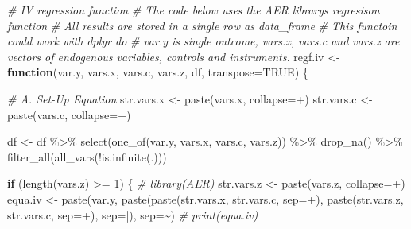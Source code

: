 \documentclass[
]{book}
\newenvironment{Shaded}{\begin{snugshade}}{\end{snugshade}}
\newcommand{\AttributeTok}[1]{\textcolor[rgb]{0.77,0.63,0.00}{#1}}
\newcommand{\CommentTok}[1]{\textcolor[rgb]{0.56,0.35,0.01}{\textit{#1}}}
\newcommand{\ConstantTok}[1]{\textcolor[rgb]{0.00,0.00,0.00}{#1}}
\newcommand{\ControlFlowTok}[1]{\textcolor[rgb]{0.13,0.29,0.53}{\textbf{#1}}}
\newcommand{\DecValTok}[1]{\textcolor[rgb]{0.00,0.00,0.81}{#1}}
\newcommand{\FunctionTok}[1]{\textcolor[rgb]{0.00,0.00,0.00}{#1}}
\newcommand{\NormalTok}[1]{#1}
\newcommand{\OtherTok}[1]{\textcolor[rgb]{0.56,0.35,0.01}{#1}}
\newcommand{\SpecialCharTok}[1]{\textcolor[rgb]{0.00,0.00,0.00}{#1}}
\newcommand{\StringTok}[1]{\textcolor[rgb]{0.31,0.60,0.02}{#1}}
\begin{document}
\begin{Shaded}
\begin{Highlighting}[]
\CommentTok{\# IV regression function}
\CommentTok{\# The code below uses the AER library\textquotesingle{}s regresison function}
\CommentTok{\# All results are stored in a single row as data\_frame}
\CommentTok{\# This functoin could work with dplyr do}
\CommentTok{\# var.y is single outcome, vars.x, vars.c and vars.z are vectors of endogenous variables, controls and instruments.}
\NormalTok{regf.iv }\OtherTok{\textless{}{-}} \ControlFlowTok{function}\NormalTok{(var.y, vars.x, }
\NormalTok{                    vars.c, vars.z, df, }\AttributeTok{transpose=}\ConstantTok{TRUE}\NormalTok{) \{}
  
  \CommentTok{\# A. Set{-}Up Equation}
\NormalTok{  str.vars.x }\OtherTok{\textless{}{-}} \FunctionTok{paste}\NormalTok{(vars.x, }\AttributeTok{collapse=}\StringTok{\textquotesingle{}+\textquotesingle{}}\NormalTok{)}
\NormalTok{  str.vars.c }\OtherTok{\textless{}{-}} \FunctionTok{paste}\NormalTok{(vars.c, }\AttributeTok{collapse=}\StringTok{\textquotesingle{}+\textquotesingle{}}\NormalTok{)}
  
\NormalTok{  df }\OtherTok{\textless{}{-}}\NormalTok{ df }\SpecialCharTok{\%\textgreater{}\%} 
    \FunctionTok{select}\NormalTok{(}\FunctionTok{one\_of}\NormalTok{(var.y, vars.x, vars.c, vars.z)) }\SpecialCharTok{\%\textgreater{}\%} 
    \FunctionTok{drop\_na}\NormalTok{() }\SpecialCharTok{\%\textgreater{}\%} \FunctionTok{filter\_all}\NormalTok{(}\FunctionTok{all\_vars}\NormalTok{(}\SpecialCharTok{!}\FunctionTok{is.infinite}\NormalTok{(.)))}
  
  \ControlFlowTok{if}\NormalTok{ (}\FunctionTok{length}\NormalTok{(vars.z) }\SpecialCharTok{\textgreater{}=} \DecValTok{1}\NormalTok{) \{}
    \CommentTok{\#     library(AER)}
\NormalTok{    str.vars.z }\OtherTok{\textless{}{-}} \FunctionTok{paste}\NormalTok{(vars.z, }\AttributeTok{collapse=}\StringTok{\textquotesingle{}+\textquotesingle{}}\NormalTok{)}
\NormalTok{    equa.iv }\OtherTok{\textless{}{-}} \FunctionTok{paste}\NormalTok{(var.y,}
                     \FunctionTok{paste}\NormalTok{(}\FunctionTok{paste}\NormalTok{(str.vars.x, str.vars.c, }\AttributeTok{sep=}\StringTok{\textquotesingle{}+\textquotesingle{}}\NormalTok{),}
                           \FunctionTok{paste}\NormalTok{(str.vars.z, str.vars.c, }\AttributeTok{sep=}\StringTok{\textquotesingle{}+\textquotesingle{}}\NormalTok{),}
                           \AttributeTok{sep=}\StringTok{\textquotesingle{}|\textquotesingle{}}\NormalTok{),}
                     \AttributeTok{sep=}\StringTok{\textquotesingle{}\textasciitilde{}\textquotesingle{}}\NormalTok{)}
    \CommentTok{\#     print(equa.iv)}
    

\end{Highlighting}
\end{Shaded}
\end{document}
